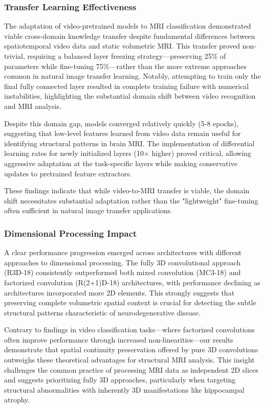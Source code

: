 \documentclass[11pt, a4paper]{article}
\begin{document}
\subsubsection{Transfer Learning Effectiveness}

The adaptation of video-pretrained models to MRI classification demonstrated viable cross-domain knowledge transfer despite fundamental differences between spatiotemporal video data and static volumetric MRI. This transfer proved non-trivial, requiring a balanced layer freezing strategy—preserving 25\% of parameters while fine-tuning 75\%—rather than the more extreme approaches common in natural image transfer learning. Notably, attempting to train only the final fully connected layer resulted in complete training failure with numerical instabilities, highlighting the substantial domain shift between video recognition and MRI analysis.

Despite this domain gap, models converged relatively quickly (5-8 epochs), suggesting that low-level features learned from video data remain useful for identifying structural patterns in brain MRI. The implementation of differential learning rates for newly initialized layers (10× higher) proved critical, allowing aggressive adaptation at the task-specific layers while making conservative updates to pretrained feature extractors.

These findings indicate that while video-to-MRI transfer is viable, the domain shift necessitates substantial adaptation rather than the "lightweight" fine-tuning often sufficient in natural image transfer applications.

\subsubsection{Dimensional Processing Impact}

A clear performance progression emerged across architectures with different approaches to dimensional processing. The fully 3D convolutional approach (R3D-18) consistently outperformed both mixed convolution (MC3-18) and factorized convolution (R(2+1)D-18) architectures, with performance declining as architectures incorporated more 2D elements. This strongly suggests that preserving complete volumetric spatial context is crucial for detecting the subtle structural patterns characteristic of neurodegenerative disease.

Contrary to findings in video classification tasks—where factorized convolutions often improve performance through increased non-linearities—our results demonstrate that spatial continuity preservation offered by pure 3D convolutions outweighs these theoretical advantages for structural MRI analysis. This insight challenges the common practice of processing MRI data as independent 2D slices and suggests prioritizing fully 3D approaches, particularly when targeting structural abnormalities with inherently 3D manifestations like hippocampal atrophy.
\end{document}
